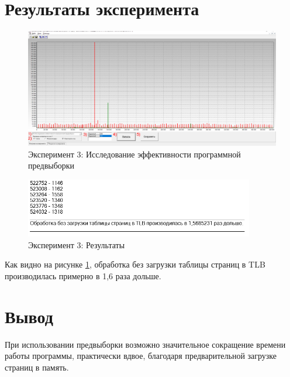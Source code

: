\section{Результаты эксперимента}
\begin{figure}[ht!]
    \centering
    \includegraphics[width=170mm]{./img/3.png}
    \caption{Эксперимент 3: Исследование эффективности программной предвыборки}
\end{figure}

\begin{figure}[ht!]
    \centering
    \includegraphics[width=100mm]{./img/03.png}
    \caption{Эксперимент 3: Результаты}
    \label{res_03}
\end{figure}

Как видно на рисунке \ref{res_03}, обработка без загрузки таблицы страниц в TLB производилась примерно в 1,6 раза дольше.

\section{Вывод}
При использовании предвыборки возможно значительное сокращение времени работы программы, практически вдвое, благодаря предварительной загрузке страниц в память.